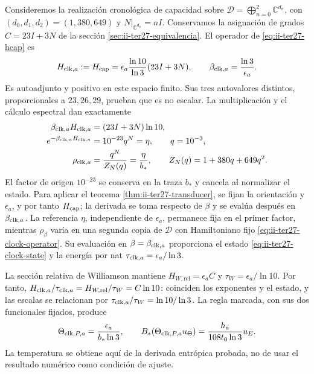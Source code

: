 Consideremos la realización cronológica de capacidad sobre
$\mathcal D=\bigoplus_{n=0}^2\mathbb C^{d_n}$, con
$(d_0,d_1,d_2)=(1,380,649)$ y $N|_{\mathbb C^{d_n}}=nI$.
Conservamos la asignación de grados $C=23I+3N$ de la sección
\ref{sec:ii-ter27-equivalencia}. El operador de
\eqref{eq:ii-ter27-hcap} es
\begin{equation}
 H_{{\rm clk},a}:=H_{\rm cap}
 =\epsilon_a\frac{\ln10}{\ln3}(23I+3N),\qquad
 \beta_{{\rm clk},a}=\frac{\ln3}{\epsilon_a}.
 \label{eq:ii-ter27-clock-operator}
\end{equation}
Es autoadjunto y positivo en este espacio finito. Sus tres autovalores
distintos, proporcionales a $23,26,29$, prueban que es no escalar.
La multiplicación y el cálculo espectral dan exactamente
\begin{align}
 \beta_{{\rm clk},a}H_{{\rm clk},a}
   &=(23I+3N)\ln10,\nonumber\\
 e^{-\beta_{{\rm clk},a}H_{{\rm clk},a}}
   &=10^{-23}q^N=\eta,\qquad q=10^{-3},\nonumber\\
 \rho_{{\rm clk},a}
   &=\frac{q^N}{Z_N(q)}=\frac{\eta}{b_*},\qquad
 Z_N(q)=1+380q+649q^2.
 \label{eq:ii-ter27-clock-state}
\end{align}
El factor de origen $10^{-23}$ se conserva en la traza $b_*$ y cancela
al normalizar el estado. Para aplicar el teorema
\ref{thm:ii-ter27-transducer}, se fijan la orientación y $\epsilon_a$,
y por tanto $H_{\rm cap}$; la derivada se toma respecto de $\beta$ y
se evalúa después en $\beta_{{\rm clk},a}$. La referencia $\eta$,
independiente de $\epsilon_a$, permanece fija en el primer factor,
mientras $\rho_\beta$ varía en una segunda copia de $\mathcal D$ con
Hamiltoniano fijo \eqref{eq:ii-ter27-clock-operator}. Su evaluación en
$\beta=\beta_{{\rm clk},a}$ proporciona el estado
\eqref{eq:ii-ter27-clock-state} y la energía por nat
$\tau_{{\rm clk},a}=\epsilon_a/\ln3$.

La sección relativa de Williamson mantiene
$H_{W,\mathrm{rel}}=\epsilon_a C$ y
$\tau_W=\epsilon_a/\ln10$. Por tanto,
$H_{{\rm clk},a}/\tau_{{\rm clk},a}
 =H_{W,\mathrm{rel}}/\tau_W=C\ln10$:
coinciden los exponentes y el estado, y las escalas se relacionan por
$\tau_{{\rm clk},a}/\tau_W=\ln10/\ln3$.
La regla marcada, con sus dos funcionales fijados, produce
\begin{equation}
 \Theta_{{\rm clk},P,a}=\frac{\epsilon_a}{b_*\ln3},\qquad
 B_*(\Theta_{{\rm clk},P,a}u_\Theta)
 =\frac{h_a}{108t_0\ln3}u_E.
 \label{eq:ii-ter27-section-test}
\end{equation}
La temperatura se obtiene aquí de la derivada entrópica probada, no de
usar el resultado numérico como condición de ajuste.


